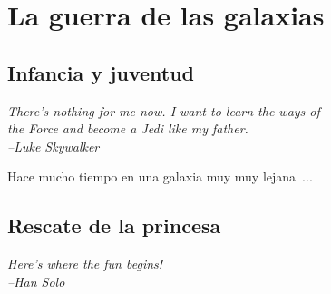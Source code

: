 \documentclass[11pt,a4paper,twoside]{tesis}
\begin{document}

\def\autor{Lautaro Lasorsa}
\def\tituloTesis{La Guerra de las Galaxias: \vspace{.2cm} \\ Rebelión e Imperio}
\def\runtitulo{La Guerra de las Galaxias: Rebelión e Imperio}
\def\runtitle{Star Wars: Rebellion and Empire}
\def\director{Rodrigo Castro}
\def\codirector{Walter Sosa Escudero}
\def\lugar{Buenos Aires, Argentina, 2024}


\frontmatter
\pagestyle{empty}


\cleardoublepage

\cleardoublepage

\cleardoublepage

\cleardoublepage
\tableofcontents

\mainmatter
\pagestyle{headings}


\chapter{La guerra de las galaxias}
\section{Infancia y juventud}
{\begin{small}%
\begin{flushright}%
\it
There's nothing for me now.
I want to learn the ways of\\ the Force and become a Jedi like my father. \\
--Luke Skywalker
\end{flushright}%
\end{small}%
\vspace{.5cm}}

Hace mucho tiempo en una galaxia muy muy lejana~\cite{starwars1977}...

\section{Rescate de la princesa}
{\begin{small}%
\begin{flushright}%
\it
Here's where the fun begins!\\
--Han Solo
\end{flushright}%
\end{small}%
\vspace{.5cm}}
\end{document}
